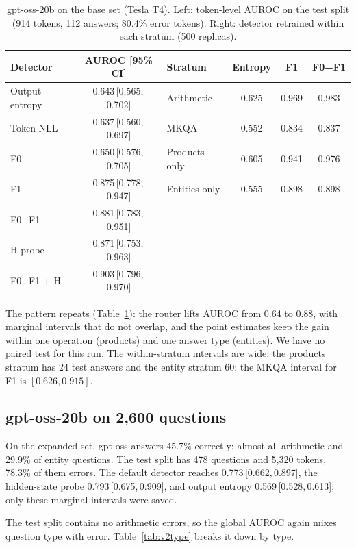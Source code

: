 \documentclass[11pt]{article}
\newcommand{\FZ}{\textsf{F0}}
\newcommand{\FO}{\textsf{F1}}
\newcommand{\FZO}{\textsf{F0+F1}}
\newcommand{\Hs}{\textsf{H}}
\newcommand{\ci}[2]{\,[#1,\,#2]}
\begin{document}
\begin{table}[t]
\centering
\small
\caption{gpt-oss-20b on the base set (Tesla T4). Left: token-level AUROC on the test split (914 tokens, 112 answers; 80.4\% error tokens). Right: detector retrained within each stratum (500 replicas).}
\label{tab:gptoss}
\begin{tabular}{lc@{\hspace{2em}}lccc}
\toprule
Detector & AUROC [95\% CI] & Stratum & Entropy & \FO{} & \FZO{} \\
\midrule
Output entropy & 0.643\ci{0.565}{0.702} & Arithmetic & 0.625 & 0.969 & 0.983 \\
Token NLL & 0.637\ci{0.560}{0.697} & MKQA & 0.552 & 0.834 & 0.837 \\
\FZ{} & 0.650\ci{0.576}{0.705} & Products only & 0.605 & 0.941 & 0.976 \\
\FO{} & 0.875\ci{0.778}{0.947} & Entities only & 0.555 & 0.898 & 0.898 \\
\FZO{} & 0.881\ci{0.783}{0.951} & & & & \\
\Hs{} probe & 0.871\ci{0.753}{0.963} & & & & \\
\FZO{} + \Hs{} & 0.903\ci{0.796}{0.970} & & & & \\
\bottomrule
\end{tabular}
\end{table}

The pattern repeats (Table~\ref{tab:gptoss}): the router lifts AUROC from 0.64 to 0.88, with marginal intervals that do not overlap, and the point estimates keep the gain within one operation (products) and one answer type (entities).
We have no paired test for this run.
The within-stratum intervals are wide: the products stratum has 24 test answers and the entity stratum 60; the MKQA interval for \FO{} is $[0.626, 0.915]$.

\subsection{gpt-oss-20b on 2,600 questions}

On the expanded set, gpt-oss answers 45.7\% correctly: almost all arithmetic and 29.9\% of entity questions.
The test split has 478 questions and 5,320 tokens, 78.3\% of them errors.
The default detector reaches 0.773\ci{0.662}{0.897}, the hidden-state probe 0.793\ci{0.675}{0.909}, and output entropy 0.569\ci{0.528}{0.613}; only these marginal intervals were saved.

The test split contains no arithmetic errors, so the global AUROC again mixes question type with error.
Table~\ref{tab:v2type} breaks it down by type.
\end{document}
